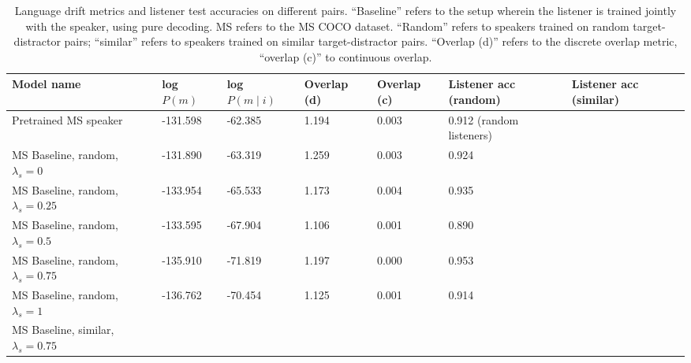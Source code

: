 \begin{table}[]
	\begin{tabularx}{\textwidth}{|X|l|l|X|X|X|X|}
		\hline
		\textbf{Model name}                                    & \textbf{log $P(m)$} & \textbf{log $P(m \mid i)$} & \textbf{Overlap (d)} & \textbf{Overlap (c)} & \textbf{Listener acc (random)} & \textbf{Listener acc (similar)} \\ \hline
		Pretrained MS speaker               &      -131.598            &           -62.385             &          1.194            &           0.003           & 0.912 (random listeners)                 &                                           \\ \hline
		MS Baseline, random, $\lambda_s = 0$      &     -131.890              &         -63.319               &        1.259       &         0.003             &             0.924                             &                                           \\ \hline
		MS Baseline, random, $\lambda_s = 0.25$    &      -133.954             &          -65.533              &          1.173            &       0.004               &           0.935                               &                                           \\ \hline
		MS Baseline, random, $\lambda_s = 0.5$      &         -133.595         &           -67.904             &        1.106              &        0.001              &             0.890                             &                                           \\ \hline
		MS Baseline, random, $\lambda_s = 0.75$   &       -135.910            &             -71.819          &        1.197              &        0.000              & 0.953                                    &                                           \\ \hline
		MS Baseline, random, $\lambda_s =1$  &      -136.762             &          -70.454              &         1.125             &          0.001            &                   0.914                       &                                           \\ \hline
		MS Baseline, similar, $\lambda_s = 0.75$  &                   &                        &                      &                      &                                          &                                           \\ \hline
	\end{tabularx}
\caption{\label{tab:coco_drift_metrics_basic} Language drift metrics and listener test accuracies on different pairs. 
	``Baseline'' refers to the setup wherein the listener is trained jointly with the speaker, using pure decoding. MS refers to the MS COCO dataset. ``Random'' refers to speakers trained on random target-distractor pairs; ``similar'' refers to speakers trained on similar target-distractor pairs. ``Overlap (d)'' refers to the discrete overlap metric, ``overlap (c)'' to continuous overlap.}
\end{table}

